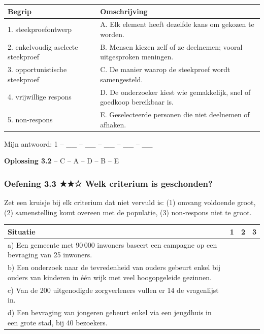\begin{tabular}{ll}
\hline
Begrip & Omschrijving \\
\hline
1. steekproefontwerp & A. Elk element heeft dezelfde kans om gekozen te worden. \\
2. enkelvoudig aselecte steekproef & B. Mensen kiezen zelf of ze deelnemen; vooral uitgesproken meningen. \\
3. opportunistische steekproef & C. De manier waarop de steekproef wordt samengesteld. \\
4. vrijwillige respons & D. De onderzoeker kiest wie gemakkelijk, snel of goedkoop bereikbaar is. \\
5. non-respons & E. Geselecteerde personen die niet deelnemen of afhaken. \\
\hline
\end{tabular}

Mijn antwoord: 1 – \_\_ – \_\_ – \_\_ – \_\_ – \_\_

\begin{oplossing}
\textbf{Oplossing 3.2}  – C  – A  – D  – B  – E
\end{oplossing}

\subsubsection*{Oefening 3.3 \quad ★★☆ \quad Welk criterium is geschonden?}

Zet een kruisje bij elk criterium dat niet vervuld is: (1) omvang voldoende groot, (2) samenstelling komt overeen met de populatie, (3) non-respons niet te groot.

\begin{tabular}{llll}
\hline
Situatie & 1 & 2 & 3 \\
\hline
a) Een gemeente met 90\,000 inwoners baseert een campagne op een bevraging van 25 inwoners. & & & \\
b) Een onderzoek naar de tevredenheid van ouders gebeurt enkel bij ouders van kinderen in één wijk met veel hoogopgeleide gezinnen. & & & \\
c) Van de 200 uitgenodigde zorgverleners vullen er 14 de vragenlijst in. & & & \\
d) Een bevraging van jongeren gebeurt enkel via een jeugdhuis in een grote stad, bij 40 bezoekers. & & & \\
\hline
\end{tabular}

